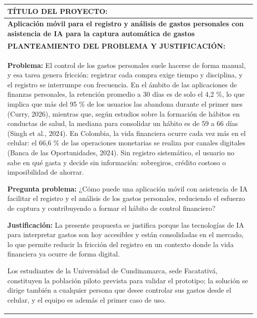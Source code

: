 \documentclass[11pt]{article}
\newcommand{\formlabel}[1]{\textbf{\small #1}}
\newcommand{\formcell}[1]{\small #1}
\begin{document}
\noindent
\begin{longtable}{|p{15.38cm}|}
\hline
\formlabel{TÍTULO DEL PROYECTO:} \\
\hline
\formcell{\textbf{Aplicación móvil para el registro y análisis de gastos personales con asistencia de IA para la captura automática de gastos}} \\
\hline
\formlabel{PLANTEAMIENTO DEL PROBLEMA Y JUSTIFICACIÓN:} \\
\hline
\formcell{\textbf{Problema:} El control de los gastos personales suele hacerse de forma manual, y esa tarea genera fricción: registrar cada compra exige tiempo y disciplina, y el registro se interrumpe con frecuencia. En el ámbito de las aplicaciones de finanzas personales, la retención promedio a 30 días es de solo el 4,2 \%, lo que implica que más del 95 \% de los usuarios las abandona durante el primer mes (Curry, 2026), mientras que, según estudios sobre la formación de hábitos en conductas de salud, la mediana para consolidar un hábito es de 59 a 66 días (Singh et al., 2024). En Colombia, la vida financiera ocurre cada vez más en el celular: el 66,6 \% de las operaciones monetarias se realiza por canales digitales (Banca de las Oportunidades, 2024). Sin registro sistemático, el usuario no sabe en qué gasta y decide sin información: sobregiros, crédito costoso o imposibilidad de ahorrar.

\vspace{0.12cm}

\textbf{Pregunta problema:} ¿Cómo puede una aplicación móvil con asistencia de IA facilitar el registro y el análisis de los gastos personales, reduciendo el esfuerzo de captura y contribuyendo a formar el hábito de control financiero?

\vspace{0.15cm}

\textbf{Justificación:} La presente propuesta se justifica porque las tecnologías de IA para interpretar gastos son hoy accesibles y están consolidadas en el mercado, lo que permite reducir la fricción del registro en un contexto donde la vida financiera ya ocurre de forma digital.

Los estudiantes de la Universidad de Cundinamarca, sede Facatativá, constituyen la población piloto prevista para validar el prototipo; la solución se dirige también a cualquier persona que desee controlar sus gastos desde el celular, y el equipo es además el primer caso de uso.

}
\end{longtable}
\end{document}
